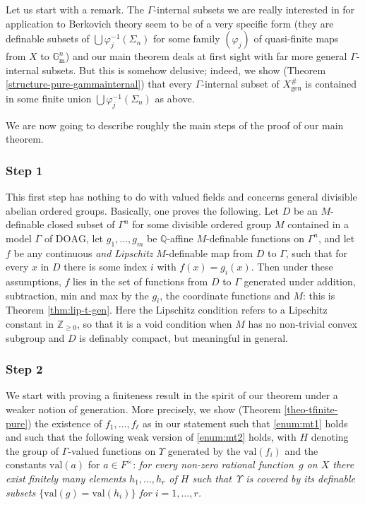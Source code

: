 \documentclass[JEP,XML,SOM,Unicode,ThmDefs,NoEqCountersInSection,published]{cedram}
\newcommand{\val}{\mathrm{val}}
\newcommand{\gm}{\bG_{\mathrm m}}
\newcommand{\DOAG}{\mathrm{DOAG}}
\newcommand{\bG}{\mathbb G}
\newcommand{\Q}{\mathbb Q}
\newcommand{\Z}{\mathbb Z}
\let\phi\varphi
\theoremstyle{plain}
\theoremstyle{definition}
\begin{document}
Let us start with a remark.
The $\Gamma$-internal subsets
we are really interested
in for application
to Berkovich theory
seem to be of a very specific form
(they are definable subsets of
$\bigcup \phi_j^{-1}(\Sigma_n)$
for some family $(\phi_j)$
of quasi-finite maps from
$X$ to $\gm^n$)
and our main theorem
deals at first sight
with far more general
$\Gamma$-internal subsets.
But this is somehow
delusive; indeed, we show
(Theorem \ref{structure-pure-gammainternal})
that every $\Gamma$-internal
subset of $X^\#_{\mathrm{gen}}$
is contained in some finite union
$\bigcup \phi_j^{-1}(\Sigma_n)$ as above.

We are now going to describe roughly the main steps of
the proof of our main theorem.

\subsubsection*{Step 1} This first step has nothing to do with valued fields and concerns
general divisible abelian ordered groups. Basically, one proves the
following. Let $D$ be an $M$-definable
closed subset of $\Gamma^n$ for some divisible
ordered group $M$ contained in a model $\Gamma$
of $\DOAG$, let $g_1,\ldots, g_m$ be $\Q$-affine
$M$-definable functions on $\Gamma^n$, and let $f$ be any continuous
\textit{and Lipschitz} $M$-definable map from $D$ to $\Gamma$, such that
for every $x$ in $D$ there is some index $i$ with $f(x)=g_i(x)$.
Then under
these assumptions, $f$ lies in the set of functions
from $D$ to $\Gamma$ generated
under addition, subtraction, min and max by
the $g_i$, the coordinate functions
and $M$: this is Theorem \ref{thm:lip-t-gen}. Here
the Lipschitz condition refers to a
Lipschitz constant in $\Z_{\geq 0}$,
so that it is a void condition when $M$
has no non-trivial convex subgroup
and $D$ is definably compact, but meaningful in general.

\subsubsection*{Step 2} We start with proving a finiteness result in the spirit of our theorem under a weaker notion of generation. More precisely, we show
(Theorem \ref{theo-tfinite-pure})
the existence
of $f_1,\ldots, f_\ell$ as in our statement
such that \eqref{enum:mt1} holds and such that the following weak version
of \eqref{enum:mt2} holds, with $H$ denoting
the group of
$\Gamma$-valued functions
on $\Upsilon$ generated by the $\val (f_i)$ and the
constants $\val (a)$ for $a\in F^\times$: \textit{for every
non-zero rational function~$g$
on $X$ there exist finitely many
elements $h_1,\ldots, h_r$
of $H$ such that~$\Upsilon$ is covered by its definable subsets $\{\val (g)=\val (h_i)\}$
for $i=1,\ldots, r$.}
\end{document}
